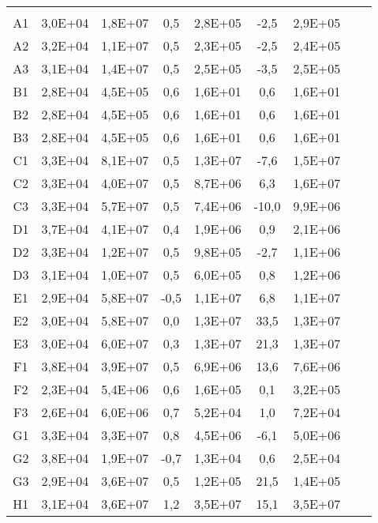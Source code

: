 \begin{center}
\begin{longtable}{ccccccccc}
\toprule
\endhead
\midrule \\ %
\endfoot
\bottomrule 
\endlastfoot
    A1    & 3,0E+04 & 1,8E+07 & 0,5   & 2,8E+05 & -2,5  & 2,9E+05 \\
    A2    & 3,2E+04 & 1,1E+07 & 0,5   & 2,3E+05 & -2,5  & 2,4E+05 \\
    A3    & 3,1E+04 & 1,4E+07 & 0,5   & 2,5E+05 & -3,5  & 2,5E+05 \\
    B1    & 2,8E+04 & 4,5E+05 & 0,6   & 1,6E+01 & 0,6   & 1,6E+01 \\
    B2    & 2,8E+04 & 4,5E+05 & 0,6   & 1,6E+01 & 0,6   & 1,6E+01 \\
    B3    & 2,8E+04 & 4,5E+05 & 0,6   & 1,6E+01 & 0,6   & 1,6E+01 \\
    C1    & 3,3E+04 & 8,1E+07 & 0,5   & 1,3E+07 & -7,6  & 1,5E+07 \\
    C2    & 3,3E+04 & 4,0E+07 & 0,5   & 8,7E+06 & 6,3   & 1,6E+07 \\
    C3    & 3,3E+04 & 5,7E+07 & 0,5   & 7,4E+06 & -10,0 & 9,9E+06 \\
    D1    & 3,7E+04 & 4,1E+07 & 0,4   & 1,9E+06 & 0,9   & 2,1E+06 \\
    D2    & 3,3E+04 & 1,2E+07 & 0,5   & 9,8E+05 & -2,7  & 1,1E+06 \\
    D3    & 3,1E+04 & 1,0E+07 & 0,5   & 6,0E+05 & 0,8   & 1,2E+06 \\
    E1    & 2,9E+04 & 5,8E+07 & -0,5  & 1,1E+07 & 6,8   & 1,1E+07 \\
    E2    & 3,0E+04 & 5,8E+07 & 0,0   & 1,3E+07 & 33,5  & 1,3E+07 \\
    E3    & 3,0E+04 & 6,0E+07 & 0,3   & 1,3E+07 & 21,3  & 1,3E+07 \\
    F1    & 3,8E+04 & 3,9E+07 & 0,5   & 6,9E+06 & 13,6  & 7,6E+06 \\
    F2    & 2,3E+04 & 5,4E+06 & 0,6   & 1,6E+05 & 0,1   & 3,2E+05 \\
    F3    & 2,6E+04 & 6,0E+06 & 0,7   & 5,2E+04 & 1,0   & 7,2E+04 \\
    G1    & 3,3E+04 & 3,3E+07 & 0,8   & 4,5E+06 & -6,1  & 5,0E+06 \\
    G2    & 3,8E+04 & 1,9E+07 & -0,7  & 1,3E+04 & 0,6   & 2,5E+04 \\
    G3    & 2,9E+04 & 3,6E+07 & 0,5   & 1,2E+05 & 21,5  & 1,4E+05 \\
    H1    & 3,1E+04 & 3,6E+07 & 1,2   & 3,5E+07 & 15,1  & 3,5E+07 \\

\end{longtable}
\end{center}
